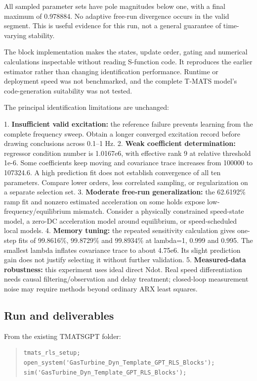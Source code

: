 All sampled parameter sets have pole magnitudes below one, with a final maximum of 0.978884. No adaptive free-run divergence occurs in the valid segment. This is useful evidence for this run, not a general guarantee of time-varying stability.

The block implementation makes the states, update order, gating and numerical calculations inspectable without reading S-function code. It reproduces the earlier estimator rather than changing identification performance. Runtime or deployment speed was not benchmarked, and the complete T-MATS model's code-generation suitability was not tested.

The principal identification limitations are unchanged:

1. \textbf{Insufficient valid excitation:} the reference failure prevents learning from the complete frequency sweep. Obtain a longer converged excitation record before drawing conclusions across 0.1--1 Hz.
2. \textbf{Weak coefficient determination:} regressor condition number is 1.0167e6, with effective rank 9 at relative threshold 1e-6. Some coefficients keep moving and covariance trace increases from 100000 to 107324.6. A high prediction fit does not establish convergence of all ten parameters. Compare lower orders, less correlated sampling, or regularization on a separate selection set.
3. \textbf{Moderate free-run generalization:} the 62.6192\% ramp fit and nonzero estimated acceleration on some holds expose low-frequency/equilibrium mismatch. Consider a physically constrained speed-state model, a zero-DC acceleration model around equilibrium, or speed-scheduled local models.
4. \textbf{Memory tuning:} the repeated sensitivity calculation gives one-step fits of 99.8616\%, 99.8729\% and 99.8934\% at lambda=1, 0.999 and 0.995. The smallest lambda inflates covariance trace to about 4.75e6. Its slight prediction gain does not justify selecting it without further validation.
5. \textbf{Measured-data robustness:} this experiment uses ideal direct Ndot. Real speed differentiation needs causal filtering/observation and delay treatment; closed-loop measurement noise may require methods beyond ordinary ARX least squares.

\subsection{Run and deliverables}

From the existing TMATSGPT folder:

\begin{quote}\footnotesize
\begin{verbatim}
tmats_rls_setup;
open_system('GasTurbine_Dyn_Template_GPT_RLS_Blocks');
sim('GasTurbine_Dyn_Template_GPT_RLS_Blocks');
\end{verbatim}
\end{quote}

